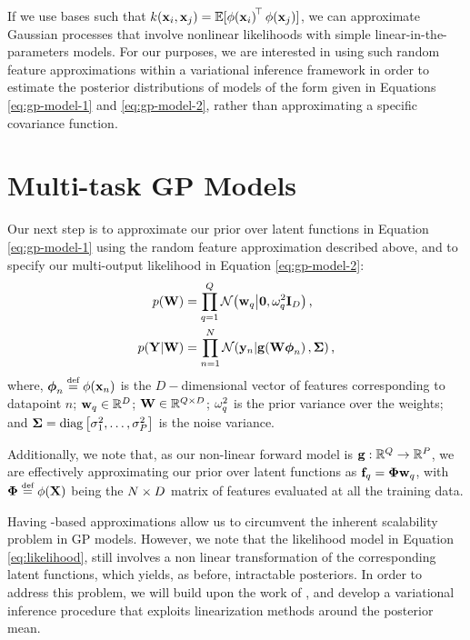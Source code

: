 If we use \rks bases  such that
$k\!\left({{\mathbf{x}_i}, {\mathbf{x}_j}}\right) = 
\mathbb{E}[\phi\!\left({{\mathbf{x}_i}}\right)^{\!\top}\phi\!\left({{\mathbf{x}_j}}\right)]$, we can
approximate Gaussian processes that involve nonlinear likelihoods 
with simple linear-in-the-parameters models. 
For our purposes, we are 
interested in using such random feature approximations within a variational inference 
framework in order to estimate the posterior distributions of models of the form given
in Equations \eqref{eq:gp-model-1} and \eqref{eq:gp-model-2}, rather than
approximating a specific covariance function.
%
\section{Multi-task GP Models}
 Our next step is to approximate our prior over latent functions in Equation \eqref{eq:gp-model-1} 
 using the random feature approximation described above, and to specify 
 our multi-output likelihood in Equation \eqref{eq:gp-model-2}:
 \begin{align}
 \label{eq:prior}
 p(\mathbf{W}) &=  \prod^Q_{q=1} \mathcal{N}\!\left({\mathbf{w}_q}\middle\vert{\mathbf{0}, \ensuremath{\omega^2}_q \ensuremath{\mathbf{I}_{D}}}\right) \text{,} \\
  \label{eq:likelihood}
    p\!\left({\mathbf{Y} }\middle\vert{\ensuremath{\mathbf{W}}}\right) &=
        \prod^N_{n=1} \mathcal{N}\!\left({\mathbf{y}_n}\middle\vert{\ensuremath{\mathbf{g}\!\left({{\mathbf{W}\boldsymbol\phi_n}}\right)}, \ensuremath{\mathbf{\Sigma}}}\right)  \text{,}
\end{align}
%
where,  $\feats_n \defeq \featfunc{\ins_n}$  is the 
 $D-$dimensional vector of features corresponding to datapoint $n$; 
$\mathbf{w}_q \in \mathbb{R}^{D}$;
 $\mathbf{W} \in \mathbb{R}^{Q   \times D}$;
$\omega^2_q$ is the prior variance over the weights; 
 and $\mathbf{\Sigma} = \operatorname{diag}{\left[{\sigma^2_1, \ldots, \sigma^2_P}\right]}$ is the  
 noise variance. 
 
Additionally, we note that, as our non-linear
forward model  is $\mathbf{g} : \mathbb{R}^{Q} \to \mathbb{R}^{P}$,  
we are effectively  approximating our prior over latent functions as 
 $\mathbf{f}_q = \boldsymbol\Phi\mathbf{w}_q$, with  $\Feats \defeq \featfunc{\Ins}$
 being the $N \times D$  matrix of features evaluated at all the training data. 
 
Having \rks-based approximations allow us to circumvent the inherent
scalability problem in GP models. However, we note that the likelihood model 
in Equation  \eqref{eq:likelihood}, still involves a non linear transformation 
of the corresponding latent functions, which yields, as before, intractable posteriors. 
In order to address this problem, we will build upon the work of 
\citet{steinberg-bonilla-nips-2014}, and develop a variational inference procedure 
that exploits linearization methods around the posterior mean.



